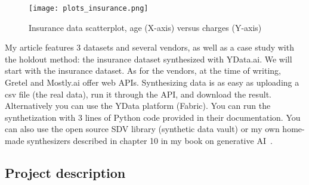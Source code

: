 \documentclass[oneside,10pt]{book}
\begin{document}
\begin{figure}[H]
\centering
\texttt{[image: plots\_insurance.png]}   
\caption{Insurance data scatterplot, age (X-axis) versus charges (Y-axis)}
\label{fig:gretelvc}
\end{figure}



My article features 3 datasets and several vendors, as well as a case study with the holdout method: the insurance dataset synthesized with
 YData.ai. We will start with the insurance dataset. As for the vendors, at the time of writing, Gretel and Mostly.ai offer web APIs. Synthesizing data is as easy as uploading a csv file (the real data), run it through the API, and download the result. Alternatively you can use the YData platform (Fabric). You can run the synthetization with 3 lines of Python code provided in their documentation.  You can also use the 
 open source SDV library (synthetic data vault) or my own home-made synthesizers described in chapter 10 in my book on generative AI~\cite{vgelsevier}.

\subsection{Project description}
\end{document}
